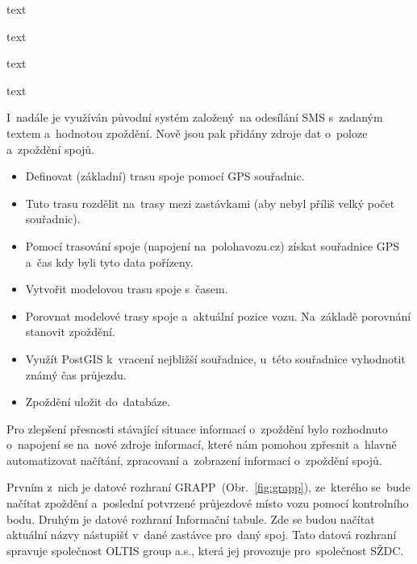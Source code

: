 
text

text

text

text

I~nadále je využíván původní systém založený~na odesílání SMS s~zadaným textem a~hodnotou zpoždění. Nově jsou pak přidány zdroje dat o~poloze a~zpoždění spojů.

\begin{itemize}
	\item Definovat (základní) trasu spoje pomocí GPS souřadnic.
	\item Tuto trasu rozdělit na~trasy mezi zastávkami (aby nebyl příliš velký počet souřadnic).
	\item Pomocí trasování spoje (napojení na~polohavozu.cz) získat souřadnice GPS a~čas kdy byli tyto data pořízeny.
	\item Vytvořit modelovou trasu spoje s~časem.
	\item Porovnat modelové trasy spoje a~aktuální pozice vozu. Na~základě porovnání stanovit zpoždění.
	\item Využít PostGIS k~vracení nejbližší souřadnice, u~této souřadnice vyhodnotit známý čas průjezdu.
	\item Zpoždění uložit do~databáze.
\end{itemize}


Pro zlepšení přesnosti stávající situace informací o~zpoždění bylo rozhodnuto o~napojení se na~nové zdroje informací, které nám pomohou zpřesnit a~hlavně automatizovat načítání, zpracovaní a~zobrazení informací o~zpoždění spojů.

Prvním z~nich je datové rozhraní GRAPP~(Obr.~\ref{fig:grapp}), ze~kterého se~bude načítat zpoždění a~poslední potvrzené průjezdové místo vozu pomocí kontrolního bodu. Druhým je datové rozhraní Informační tabule. Zde se budou načítat aktuální názvy nástupišť v~dané zastávce pro~daný spoj. Tato datová rozhraní spravuje společnost OLTIS group a.s., která jej provozuje pro~společnost SŽDC.

